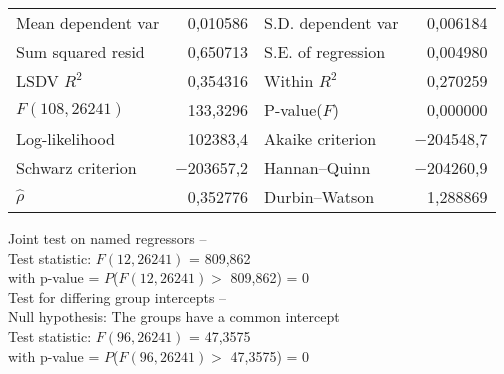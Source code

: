 \begin{center}
\vspace{1ex}
\begin{tabular}{lrlr}
Mean dependent var &  0,010586 & S.D. dependent var &  0,006184 \\
Sum squared resid &  0,650713 & S.E. of regression &  0,004980 \\
LSDV $R^2$ &  0,354316 & Within $R^2$ &  0,270259 \\
$F(108, 26241)$ &  133,3296 & P-value($F$) &  0,000000 \\
Log-likelihood &  102383,4 & Akaike criterion & $-$204548,7 \\
Schwarz criterion & $-$203657,2 & Hannan--Quinn & $-$204260,9 \\
$\hat{\rho}$ &  0,352776 & Durbin--Watson &  1,288869 \\
\end{tabular}

\vspace{1em}
\begin{raggedright}
Joint test on named regressors --\\
\quad Test statistic: $F(12, 26241)$ = 809,862\\
\quad with p-value = $P$($F(12, 26241) >$ 809,862) = 0\\
\vspace{1ex}
Test for differing group intercepts --\\
\quad Null hypothesis: The groups have a common intercept\\
\quad Test statistic: $F(96, 26241)$ = 47,3575\\
\quad with p-value = $P$($F(96, 26241) >$ 47,3575) = 0\\
\vspace{1ex}
\end{raggedright}

\end{center}
